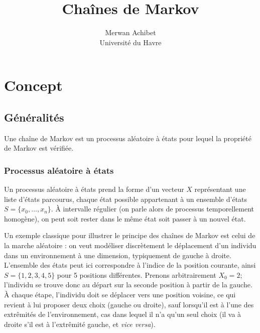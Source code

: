 \documentclass[12pt]{article}
\title{Chaînes de Markov}
\author{Merwan Achibet\\Université du Havre}
\date{}
\begin{document}
\maketitle

\section{Concept}

\subsection{Généralités}

Une chaîne de Markov est un processus aléatoire à états pour lequel la
propriété de Markov est vérifiée.

\subsubsection{Processus aléatoire à états}

Un processus aléatoire à états prend la forme d'un vecteur $X$
représentant une liste d'états parcourus, chaque état possible
appartenant à un ensemble d'états $S = \{x_0, \dots, x_n \}$. \`A
intervalle régulier (on parle alors de processus temporellement
homogène), on peut soit rester dans le même état soit passer à un
nouvel état.

Un exemple classique pour illustrer le principe des chaînes de Markov
est celui de la marche aléatoire \cite{ocone} : on veut modéliser
discrètement le déplacement d'un individu dans un environnement à une
dimension, typiquement de gauche à droite. L'ensemble des états peut
ici correspondre à l'indice de la position courante, ainsi $S = \{1,
2, 3, 4, 5\}$ pour 5 positions différentes. Prenons arbitrairement
$X_0 = 2$; l'individu se trouve donc au départ sur la seconde position
à partir de la gauche. \`A chaque étape, l'individu doit se déplacer
vers une position voisine, ce qui revient à lui proposer deux choix
(gauche ou droite), sauf lorsqu'il est à l'une des extrêmités de
l'environnement, cas dans lequel il n'a qu'un seul choix (il va à
droite s'il est à l'extrêmité gauche, et \textit{vice versa}).
\end{document}
